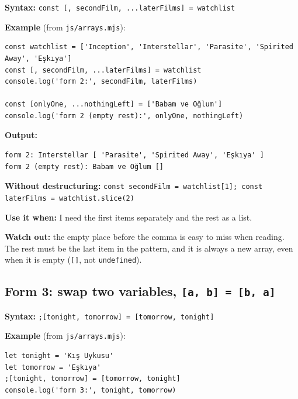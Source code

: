 \documentclass[
]{article}
\newcommand{\passthrough}[1]{#1}
\begin{document}
\textbf{Syntax:}
\passthrough{\lstinline!const [, secondFilm, ...laterFilms] = watchlist!}

\textbf{Example} (from \passthrough{\lstinline!js/arrays.mjs!}):

\begin{lstlisting}
const watchlist = ['Inception', 'Interstellar', 'Parasite', 'Spirited Away', 'Eşkıya']
const [, secondFilm, ...laterFilms] = watchlist
console.log('form 2:', secondFilm, laterFilms)

const [onlyOne, ...nothingLeft] = ['Babam ve Oğlum']
console.log('form 2 (empty rest):', onlyOne, nothingLeft)
\end{lstlisting}

\textbf{Output:}

\begin{lstlisting}
form 2: Interstellar [ 'Parasite', 'Spirited Away', 'Eşkıya' ]
form 2 (empty rest): Babam ve Oğlum []
\end{lstlisting}

\textbf{Without destructuring:}
\passthrough{\lstinline!const secondFilm = watchlist[1]; const laterFilms = watchlist.slice(2)!}

\textbf{Use it when:} I need the first items separately and the rest as
a list.

\textbf{Watch out:} the empty place before the comma is easy to miss
when reading. The rest must be the last item in the pattern, and it is
always a new array, even when it is empty (\passthrough{\lstinline![]!},
not \passthrough{\lstinline!undefined!}).

\hypertarget{form-3-swap-two-variables-a-b-b-a}{%
\subsection{\texorpdfstring{Form 3: swap two variables,
\texttt{{[}a,\ b{]}\ =\ {[}b,\ a{]}}}{Form 3: swap two variables, {[}a, b{]} = {[}b, a{]}}}\label{form-3-swap-two-variables-a-b-b-a}}

\textbf{Syntax:}
\passthrough{\lstinline!;[tonight, tomorrow] = [tomorrow, tonight]!}

\textbf{Example} (from \passthrough{\lstinline!js/arrays.mjs!}):

\begin{lstlisting}
let tonight = 'Kış Uykusu'
let tomorrow = 'Eşkıya'
;[tonight, tomorrow] = [tomorrow, tonight]
console.log('form 3:', tonight, tomorrow)
\end{lstlisting}
\end{document}
